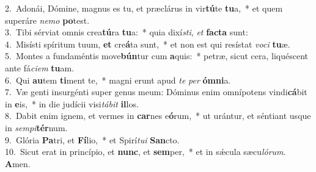 {2.~}Adonái, Dómine, magnus es tu, et præclárus in vir\textbf{tú}te \textbf{tu}a,~* et quem superáre \textit{ne}\textit{mo} \textbf{po}test.\\
{3.~}Tibi sérviat omnis crea\textbf{tú}ra \textbf{tu}a:~* quia dixí\textit{sti}, \textit{et} \textbf{fa}\textbf{cta} sunt:\\
{4.~}Misísti spíritum tuum, \textbf{et} cre\textbf{á}ta sunt,~* et non est qui resístat \textit{vo}\textit{ci} \textbf{tu}æ.\\
{5.~}Montes a fundaméntis move\textbf{bún}tur cum \textbf{a}quis:~* petræ, sicut cera, liquéscent ante fá\textit{ci}\textit{em} \textbf{tu}am.\\
{6.~}Qui \textbf{au}tem \textbf{ti}ment te,~* magni erunt apud \textit{te} \textit{per} \textbf{óm}\textbf{ni}a.\\
{7.~}Væ genti insurgénti super genus meum: Dóminus enim omnípotens vindi\textbf{cá}bit in \textbf{e}is,~* in die judícii visi\textit{tá}\textit{bit} \textbf{il}los.\\
{8.~}Dabit enim ignem, et vermes in \textbf{car}nes e\textbf{ó}rum,~* ut urántur, et séntiant usque in \textit{sem}\textit{pi}\textbf{tér}num.\\
{9.~}Glória \textbf{Pa}tri, et \textbf{Fí}lio,~* et Spirí\textit{tu}\textit{i} \textbf{San}cto.\\
{10.~}Sicut erat in princípio, et \textbf{nunc}, et \textbf{sem}per,~* et in sǽcula sæcu\textit{ló}\textit{rum}. \textbf{A}men.\\
